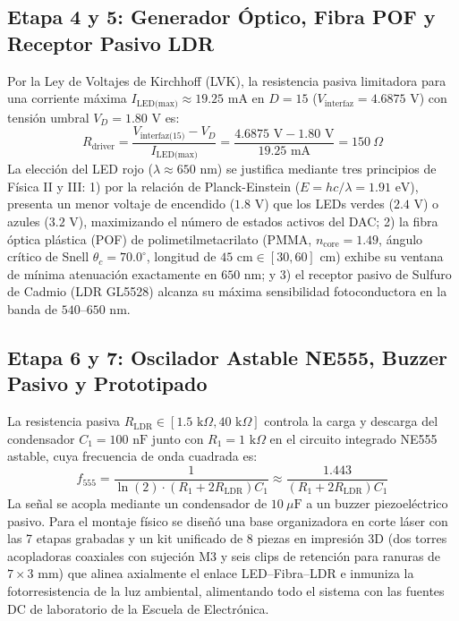 \documentclass[journal,transmag]{IEEEtran}
\begin{document}
\subsection{Etapa 4 y 5: Generador Óptico, Fibra POF y Receptor Pasivo LDR}
Por la Ley de Voltajes de Kirchhoff (LVK), la resistencia pasiva limitadora para una corriente máxima $I_{\text{LED(max)}} \approx 19.25\text{ mA}$ en $D = 15$ ($V_{\text{interfaz}} = 4.6875\text{ V}$) con tensión umbral $V_D = 1.80\text{ V}$ es:
\begin{equation}
R_{\text{driver}} = \frac{V_{\text{interfaz(15)}} - V_D}{I_{\text{LED(max)}}} = \frac{4.6875\text{ V} - 1.80\text{ V}}{19.25\text{ mA}} = 150\ \Omega
\end{equation}
La elección del LED rojo ($\lambda \approx 650\text{ nm}$) se justifica mediante tres principios de Física II y III: 1) por la relación de Planck-Einstein ($E = hc/\lambda = 1.91\text{ eV}$), presenta un menor voltaje de encendido ($1.8\text{ V}$) que los LEDs verdes ($2.4\text{ V}$) o azules ($3.2\text{ V}$), maximizando el número de estados activos del DAC; 2) la fibra óptica plástica (POF) de polimetilmetacrilato (PMMA, $n_{\text{core}} = 1.49$, ángulo crítico de Snell $\theta_c = 70.0^\circ$, longitud de $45\text{ cm} \in [30, 60]\text{ cm}$) exhibe su ventana de mínima atenuación exactamente en $650\text{ nm}$; y 3) el receptor pasivo de Sulfuro de Cadmio (LDR GL5528) alcanza su máxima sensibilidad fotoconductora en la banda de $540\text{--}650\text{ nm}$.

\subsection{Etapa 6 y 7: Oscilador Astable NE555, Buzzer Pasivo y Prototipado}
La resistencia pasiva $R_{\text{LDR}} \in [1.5\text{ k}\Omega, 40\text{ k}\Omega]$ controla la carga y descarga del condensador $C_1 = 100\text{ nF}$ junto con $R_1 = 1\text{ k}\Omega$ en el circuito integrado NE555 astable, cuya frecuencia de onda cuadrada es:
\begin{equation}
f_{555} = \frac{1}{\ln(2)\cdot(R_1 + 2R_{\text{LDR}})C_1} \approx \frac{1.443}{(R_1 + 2R_{\text{LDR}})C_1}
\end{equation}
La señal se acopla mediante un condensador de $10\ \mu\text{F}$ a un buzzer piezoeléctrico pasivo. Para el montaje físico se diseñó una base organizadora en corte láser con las 7 etapas grabadas y un kit unificado de 8 piezas en impresión 3D (dos torres acopladoras coaxiales con sujeción M3 y seis clips de retención para ranuras de $7\times 3\text{ mm}$) que alinea axialmente el enlace LED--Fibra--LDR e inmuniza la fotorresistencia de la luz ambiental, alimentando todo el sistema con las fuentes DC de laboratorio de la Escuela de Electrónica.
\end{document}
